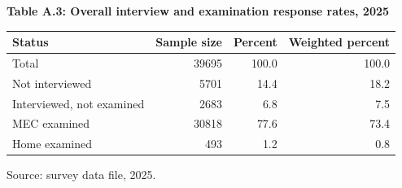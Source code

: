 \documentclass{article}
\begin{document}
\noindent\textbf{Table A.3: Overall interview and examination response rates, 2025}

\begin{tabular}{lrrr}
\toprule[2pt]
Status & Sample size & Percent & Weighted percent \\
\midrule[2pt]
Total & 39695 & 100.0 & 100.0 \\
Not interviewed & 5701 & 14.4 & 18.2 \\
Interviewed, not examined & 2683 & 6.8 & 7.5 \\
MEC examined & 30818 & 77.6 & 73.4 \\
Home examined & 493 & 1.2 & 0.8 \\
\bottomrule[2pt]
\end{tabular}

Source: survey data file, 2025.
\end{document}
